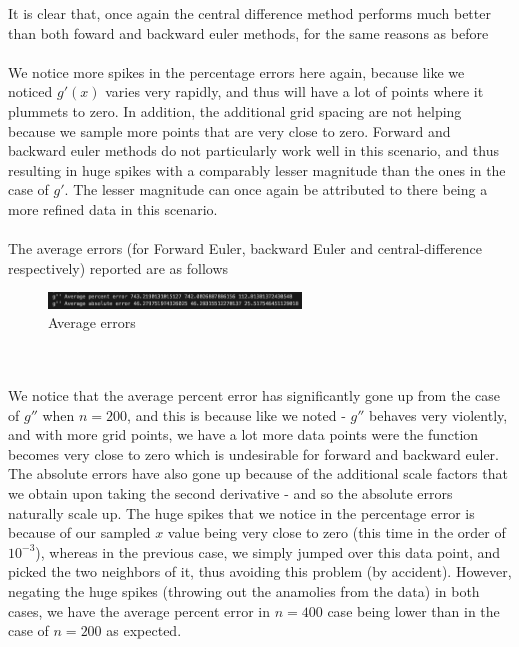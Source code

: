 \documentclass[12pt]{article}
\begin{document}
It is clear that, once again the central difference method performs much better than both foward and backward euler methods, for the same reasons as before \\\\
We notice more spikes in the percentage errors here again, because like we noticed $g'(x)$ varies very rapidly, and thus will have a lot of points where it plummets to zero. In addition, the additional grid spacing are not helping because we sample more points that are very close to zero. Forward and backward euler methods do not particularly work well in this scenario, and thus resulting in huge spikes with a comparably lesser magnitude than the ones in the case of $g'$. The lesser magnitude can once again be attributed to there being a more refined data in this scenario. \\\\
The average errors (for Forward Euler, backward Euler and central-difference respectively) reported are as follows 
\begin{figure}[h]
	\centering
	\includegraphics[width=0.60\textwidth]{errorgdpr400.png}
	\caption{Average errors}
\end{figure}\\\\
We notice that the average percent error has significantly gone up from the case of $g''$ when $n=200$, and this is because like we noted - $g''$ behaves very violently, and with more grid points, we have a lot more data points were the function becomes very close to zero which is undesirable for forward and backward euler. The absolute errors have also gone up because of the additional scale factors that we obtain upon taking the second derivative - and so the absolute errors naturally scale up. The huge spikes that we notice in the percentage error is because of our sampled $x$ value being very close to zero (this time in the order of $10^{-3}$), whereas in the previous case, we simply jumped over this data point, and picked the two neighbors of it, thus avoiding this problem (by accident). However, negating the huge spikes (throwing out the anamolies from the data) in both cases, we have the average percent error in $n=400$ case being lower than in the case of $n=200$ as expected. \\\\
\end{document}
